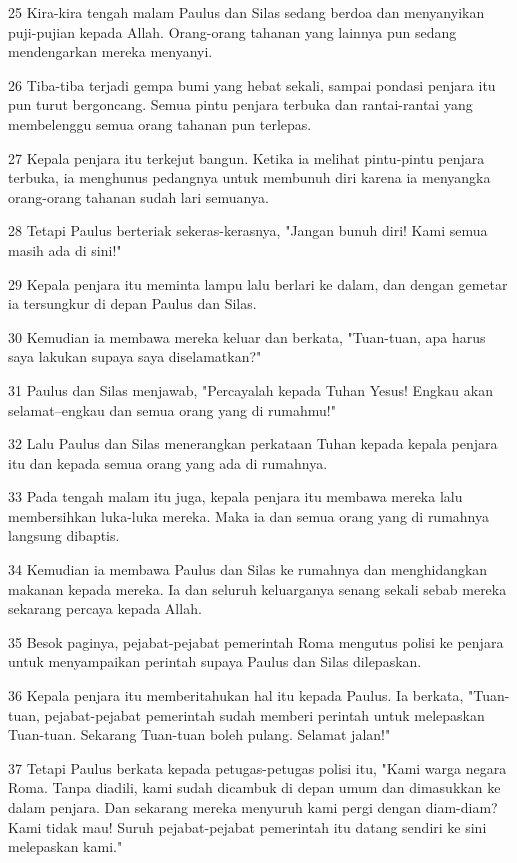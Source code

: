 \par 25 Kira-kira tengah malam Paulus dan Silas sedang berdoa dan menyanyikan puji-pujian kepada Allah. Orang-orang tahanan yang lainnya pun sedang mendengarkan mereka menyanyi.
\par 26 Tiba-tiba terjadi gempa bumi yang hebat sekali, sampai pondasi penjara itu pun turut bergoncang. Semua pintu penjara terbuka dan rantai-rantai yang membelenggu semua orang tahanan pun terlepas.
\par 27 Kepala penjara itu terkejut bangun. Ketika ia melihat pintu-pintu penjara terbuka, ia menghunus pedangnya untuk membunuh diri karena ia menyangka orang-orang tahanan sudah lari semuanya.
\par 28 Tetapi Paulus berteriak sekeras-kerasnya, "Jangan bunuh diri! Kami semua masih ada di sini!"
\par 29 Kepala penjara itu meminta lampu lalu berlari ke dalam, dan dengan gemetar ia tersungkur di depan Paulus dan Silas.
\par 30 Kemudian ia membawa mereka keluar dan berkata, "Tuan-tuan, apa harus saya lakukan supaya saya diselamatkan?"
\par 31 Paulus dan Silas menjawab, "Percayalah kepada Tuhan Yesus! Engkau akan selamat--engkau dan semua orang yang di rumahmu!"
\par 32 Lalu Paulus dan Silas menerangkan perkataan Tuhan kepada kepala penjara itu dan kepada semua orang yang ada di rumahnya.
\par 33 Pada tengah malam itu juga, kepala penjara itu membawa mereka lalu membersihkan luka-luka mereka. Maka ia dan semua orang yang di rumahnya langsung dibaptis.
\par 34 Kemudian ia membawa Paulus dan Silas ke rumahnya dan menghidangkan makanan kepada mereka. Ia dan seluruh keluarganya senang sekali sebab mereka sekarang percaya kepada Allah.
\par 35 Besok paginya, pejabat-pejabat pemerintah Roma mengutus polisi ke penjara untuk menyampaikan perintah supaya Paulus dan Silas dilepaskan.
\par 36 Kepala penjara itu memberitahukan hal itu kepada Paulus. Ia berkata, "Tuan-tuan, pejabat-pejabat pemerintah sudah memberi perintah untuk melepaskan Tuan-tuan. Sekarang Tuan-tuan boleh pulang. Selamat jalan!"
\par 37 Tetapi Paulus berkata kepada petugas-petugas polisi itu, "Kami warga negara Roma. Tanpa diadili, kami sudah dicambuk di depan umum dan dimasukkan ke dalam penjara. Dan sekarang mereka menyuruh kami pergi dengan diam-diam? Kami tidak mau! Suruh pejabat-pejabat pemerintah itu datang sendiri ke sini melepaskan kami."
